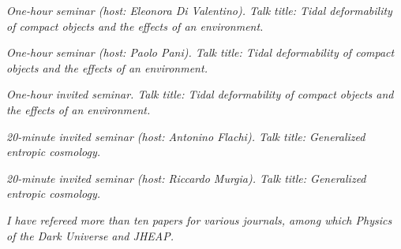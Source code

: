 \resumeSubHeadingListStart
{}
\begin{indentedtext}
\textit{One-hour seminar (host: Eleonora Di Valentino). Talk title: Tidal deformability of compact objects and the effects of an environment.}
\end{indentedtext}
\resumeSubHeadingListEnd

\resumeSubHeadingListStart
{}
\begin{indentedtext}
\textit{One-hour seminar (host: Paolo Pani). Talk title: Tidal deformability of compact objects and the effects of an environment.}
\end{indentedtext}
\resumeSubHeadingListEnd

\resumeSubHeadingListStart
{}
\begin{indentedtext}
\textit{One-hour invited seminar. Talk title: Tidal deformability of compact objects and the effects of an environment.}
\end{indentedtext}
\resumeSubHeadingListEnd

\resumeSubHeadingListStart
{}
\begin{indentedtext}
\textit{20-minute invited seminar (host: Antonino Flachi). Talk title: Generalized entropic cosmology.}
\end{indentedtext}
\resumeSubHeadingListEnd

\resumeSubHeadingListStart
{}
\begin{indentedtext}
\textit{20-minute invited seminar (host: Riccardo Murgia). Talk title: Generalized entropic cosmology.}
\end{indentedtext}
\resumeSubHeadingListEnd

\resumeSubHeadingListStart
{}
\begin{indentedtext}
\textit{I have refereed more than ten papers for various journals, among which \textit{Physics of the Dark Universe} and \textit{JHEAP}.}
\end{indentedtext}
\resumeSubHeadingListEnd
